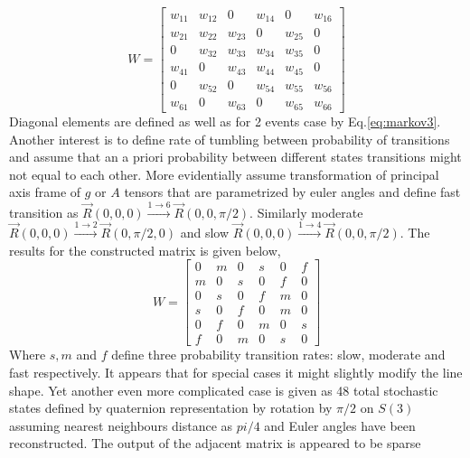 \begin{equation}\label{eq:Wmat1}
W = \begin{bmatrix}
       w_{11} & w_{12} & 0 & w_{14} & 0 & w_{16}  \\[0.3em]
       w_{21} & w_{22} & w_{23} & 0 & w_{25} & 0  \\[0.3em]
       0 & w_{32} & w_{33} & w_{34} & w_{35} & 0  \\[0.3em]
       w_{41} & 0 & w_{43} & w_{44} & w_{45} & 0 \\[0.3em]
       0 & w_{52} & 0 & w_{54} & w_{55} & w_{56} \\[0.3em]
       w_{61} & 0 & w_{63} & 0 & w_{65} & w_{66} 
     \end{bmatrix}
\end{equation}
Diagonal elements are defined as well as for 2 events case by Eq.\ref{eq:markov3}. Another interest is to define rate of tumbling between probability of transitions and assume that an a priori probability between different states transitions might not equal to each other. More evidentially assume transformation of principal axis frame of $g$ or $A$ tensors that are parametrized by euler angles and define  fast transition as $\vec{R}(0,0,0)\xrightarrow {1\rightarrow 6}\vec{R}(0,0,\pi/2)$. Similarly moderate $\vec{R}(0,0,0)\xrightarrow {1\rightarrow 2}\vec{R}(0,\pi/2,0)$  and slow $\vec{R}(0,0,0)\xrightarrow {1\rightarrow 4}\vec{R}(0,0,\pi/2)$. The results for the constructed matrix is given below,   
\begin{equation}\label{eq:Wmat2}
W = \begin{bmatrix}
       0 & m & 0 & s & 0 & f  \\[0.3em]
       m & 0 & s & 0 & f & 0  \\[0.3em]
       0 & s & 0 & f & m & 0  \\[0.3em]
       s & 0 & f & 0 & m & 0 \\[0.3em]
       0 & f & 0 & m & 0 & s \\[0.3em]
       f & 0 & m & 0 & s & 0 
     \end{bmatrix}
\end{equation}
Where $s,m$ and $f$ define three probability transition rates: slow, moderate and fast respectively. It appears that for special cases it might slightly modify the line shape. Yet another even more complicated case is given as 48 total stochastic states defined by quaternion representation by rotation by $\pi/2$ on $S(3)$ assuming nearest neighbours distance as $pi/4$ and Euler angles have been reconstructed. The output of the adjacent matrix is appeared to be sparse
